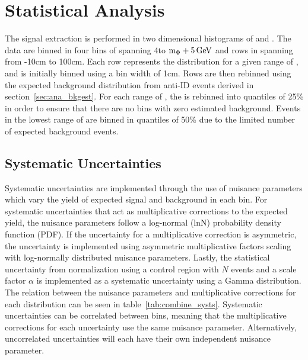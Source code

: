 \section{Statistical Analysis} \label{sec:ana_stats}
The signal extraction is performed in two dimensional histograms of \lxy and \mgg. The data are binned in four bins of \mgg spanning 4\GeV to $\text{m}_\Phi+5\,\text{Ge\hspace{-.08em}V}$ and rows in \lxy spanning from -10\unit{cm} to 100\unit{cm}. Each row represents the \lxy distribution for a given range of \mgg, and is initially binned using a bin width of 1\unit{cm}. Rows are then rebinned using the expected background distribution from anti-ID events derived in section~\ref{sec:ana_bkgest}. For each range of \mgg, the \lxy is rebinned into quantiles of 25\% in order to ensure that there are no bins with zero estimated background. Events in the lowest range of \mgg are binned in quantiles of 50\% due to the limited number of expected background events.

\subsection{Systematic Uncertainties} \label{sec:ana_systs}
Systematic uncertainties are implemented through the use of nuisance parameters which vary the yield of expected signal and background in each bin. For systematic uncertainties that act as multiplicative corrections to the expected yield, the nuisance parameters follow a log-normal (lnN) probability density function (PDF). If the uncertainty for a multiplicative correction is asymmetric, the uncertainty is implemented using asymmetric multiplicative factors scaling with log-normally distributed nuisance parameters. Lastly, the statistical uncertainty from normalization using a control region with $N$ events and a scale factor $\alpha$ is implemented as a systematic uncertainty using a Gamma distribution. The relation between the nuisance parameters and multiplicative corrections for each distribution can be seen in table~\ref{tab:combine_systs}. Systematic uncertainties can be correlated between bins, meaning that the multiplicative corrections for each uncertainty use the same nuisance parameter. Alternatively, uncorrelated uncertainties will each have their own independent nuisance parameter.

